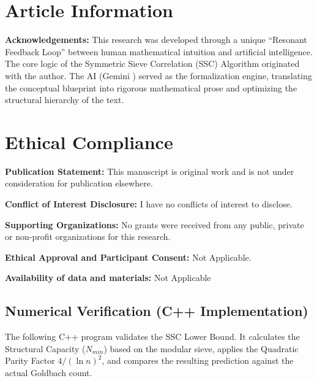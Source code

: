 \documentclass[sn-mathphys-num, pdflatex]{sn-jnl}
\begin{document}
\section*{Article Information}
\textbf{Acknowledgements:} This research was developed through a unique ``Resonant Feedback Loop'' between human mathematical intuition and artificial intelligence. The core logic of the 
Symmetric Sieve Correlation (SSC) Algorithm originated with the author. The AI (Gemini \cite{gemini2025}) served as the formalization engine, translating the conceptual blueprint into rigorous mathematical prose and optimizing the structural hierarchy of the text. 

\section*{Ethical Compliance}
\noindent \textbf{Publication Statement:} This manuscript is original work and is not under consideration for publication elsewhere. 

\noindent \textbf{Conflict of Interest Disclosure:} I have no conflicts of interest to disclose.   

\noindent \textbf{Supporting Organizations:} No grants were received from any public, private or non-profit organizations for this research. 

\noindent \textbf{Ethical Approval and Participant Consent:} Not Applicable. 

\noindent \textbf{Availability of data and materials:} Not Applicable

\appendix



\subsection*{Numerical Verification (C++ Implementation)}

The following C++ program validates the SSC Lower Bound. It calculates the Structural Capacity ($N_{min}$) based on the modular sieve, applies the Quadratic Parity Factor $4/(\ln n)^2$, and compares the resulting prediction against the actual Goldbach count.
\end{document}
